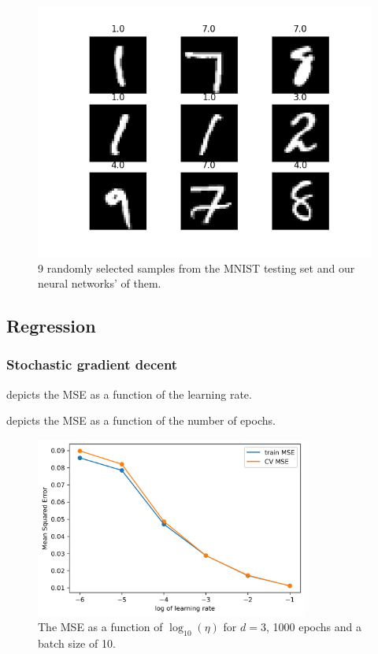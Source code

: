 \documentclass[../main.tex]{subfiles}
\begin{document}
\begin{figure}[!htb]
    \centering
    \includegraphics[width=\textwidth]{doc/assets/nn_sigmoid_mnist_plot.png}
    \caption{9 randomly selected samples from the MNIST testing set and our neural networks' of them.}
    \label{fig:mnist_predictions}
\end{figure}

\subsection{Regression}
\subsubsection{Stochastic gradient decent}
 depicts the MSE as a function of the learning rate. 

 depicts the MSE as a function of the number of epochs. 

\begin{figure}[!htb]
    \centering
    \includegraphics[width=0.8\textwidth]{../assets/etas_vs_mse.png}
    \caption{The MSE as a function of $\log_{10}(\eta)$ for $d=3$, 1000 epochs and a batch size of 10.}
    \label{fig:etas_vs_mse}
\end{figure}
\end{document}
